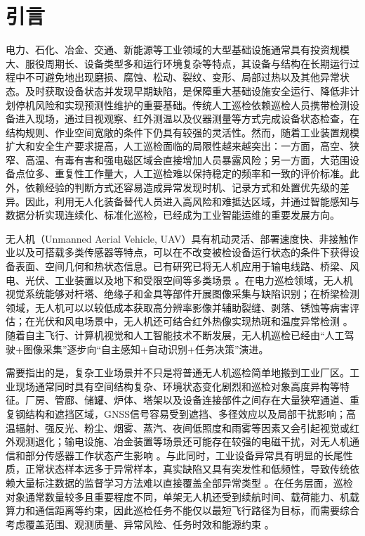 \section{引言}

电力、石化、冶金、交通、新能源等工业领域的大型基础设施通常具有投资规模大、服役周期长、设备类型多和运行环境复杂等特点，其设备与结构在长期运行过程中不可避免地出现磨损、腐蚀、松动、裂纹、变形、局部过热以及其他异常状态。及时获取设备状态并发现早期缺陷，是保障重大基础设施安全运行、降低非计划停机风险和实现预测性维护的重要基础。传统人工巡检依赖巡检人员携带检测设备进入现场，通过目视观察、红外测温以及仪器测量等方式完成设备状态检查，在结构规则、作业空间宽敞的条件下仍具有较强的灵活性。然而，随着工业装置规模扩大和安全生产要求提高，人工巡检面临的局限性越来越突出：一方面，高空、狭窄、高温、有毒有害和强电磁区域会直接增加人员暴露风险；另一方面，大范围设备点位多、重复性工作量大，人工巡检难以保持稳定的频率和一致的评价标准。此外，依赖经验的判断方式还容易造成异常发现时机、记录方式和处置优先级的差异。因此，利用无人化装备替代人员进入高风险和难抵达区域，并通过智能感知与数据分析实现连续化、标准化巡检，已经成为工业智能运维的重要发展方向。

无人机（Unmanned Aerial Vehicle, UAV）具有机动灵活、部署速度快、非接触作业以及可搭载多类传感器等特点，可以在不改变被检设备运行状态的条件下获得设备表面、空间几何和热状态信息。已有研究已将无人机应用于输电线路、桥梁、风电、光伏、工业装置以及地下和受限空间等多类场景
\cite{shakhatreh2019survey,floreano2015science,kumar2012opportunities,cai2014survey,kendoul2012survey}。在电力巡检领域，无人机视觉系统能够对杆塔、绝缘子和金具等部件开展图像采集与缺陷识别；在桥梁检测领域，无人机可以以较低成本获取高分辨率影像并辅助裂缝、剥落、锈蚀等病害评估；在光伏和风电场景中，无人机还可结合红外热像实现热斑和温度异常检测
\cite{nguyen2018automatic,miao2020uav,zhouwq2024review,morgenthal2014quality,ham2016visual,dorafshan2018bridge,spencer2019advances,jadin2012recent,usamentiaga2014infrared}。随着自主飞行、计算机视觉和人工智能技术不断发展，无人机巡检已经由“人工驾驶+图像采集”逐步向“自主感知+自动识别+任务决策”演进。

需要指出的是，复杂工业场景并不只是将普通无人机巡检简单地搬到工业厂区。工业现场通常同时具有空间结构复杂、环境状态变化剧烈和巡检对象高度异构等特征。厂房、管廊、储罐、炉体、塔架以及设备连接部件之间存在大量狭窄通道、重复钢结构和遮挡区域，GNSS信号容易受到遮挡、多径效应以及局部干扰影响；高温辐射、强反光、粉尘、烟雾、蒸汽、夜间低照度和雨雾等因素又会引起视觉或红外观测退化；输电设施、冶金装置等场景还可能存在较强的电磁干扰，对无人机通信和部分传感器工作状态产生影响
\cite{scaramuzza2014vision,stoecker2017review,lvyang2019sense,zeng2016wireless,mozaffari2019tutorial}。与此同时，工业设备异常具有明显的长尾性质，正常状态样本远多于异常样本，真实缺陷又具有突发性和低频性，导致传统依赖大量标注数据的监督学习方法难以直接覆盖全部异常类型
\cite{taox2021survey,pang2021deep}。在任务层面，巡检对象通常数量较多且重要程度不同，单架无人机还受到续航时间、载荷能力、机载算力和通信距离等约束，因此巡检任务不能仅以最短飞行路径为目标，而需要综合考虑覆盖范围、观测质量、异常风险、任务时效和能源约束
\cite{zeng2016wireless,zhang2019energy,zhou2018computation}。

